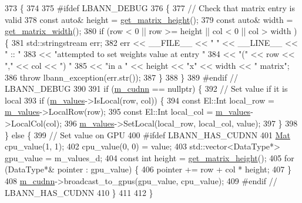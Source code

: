 \begin{DoxyCode}
373                                                         \{
374 
375 \textcolor{preprocessor}{#ifdef LBANN\_DEBUG}
376   \{
377     \textcolor{comment}{// Check that matrix entry is valid}
378     \textcolor{keyword}{const} \textcolor{keyword}{auto}& height = \hyperlink{classlbann_1_1weights_ad36676b9b43bced1cc7e332e3745411f}{get\_matrix\_height}();
379     \textcolor{keyword}{const} \textcolor{keyword}{auto}& width = \hyperlink{classlbann_1_1weights_abc3cf3a5b992302b1eaaea1fdf3b377d}{get\_matrix\_width}();
380     \textcolor{keywordflow}{if} (row < 0 || row >= height || col < 0 || col > width ) \{
381       std::stringstream err;
382       err << \_\_FILE\_\_ << \textcolor{stringliteral}{" "} << \_\_LINE\_\_ << \textcolor{stringliteral}{" :: "}
383           << \textcolor{stringliteral}{"attempted to set weights value at entry "}
384           << \textcolor{stringliteral}{"("} << row << \textcolor{stringliteral}{","} << col << \textcolor{stringliteral}{") "}
385           << \textcolor{stringliteral}{"in a "} << height << \textcolor{stringliteral}{"x"} << width << \textcolor{stringliteral}{" matrix"};
386       \textcolor{keywordflow}{throw} lbann\_exception(err.str());
387     \}
388   \}
389 \textcolor{preprocessor}{#endif // LBANN\_DEBUG}
390 
391   \textcolor{keywordflow}{if} (\hyperlink{classlbann_1_1weights_a873e8c14998915e442d03b8dd7d2fdf7}{m\_cudnn} == \textcolor{keyword}{nullptr}) \{
392     \textcolor{comment}{// Set value if it is local}
393     \textcolor{keywordflow}{if} (\hyperlink{classlbann_1_1weights_a6b2df671b6d4c4dd595477971eea0543}{m\_values}->IsLocal(row, col)) \{
394       \textcolor{keyword}{const} El::Int local\_row = \hyperlink{classlbann_1_1weights_a6b2df671b6d4c4dd595477971eea0543}{m\_values}->LocalRow(row);
395       \textcolor{keyword}{const} El::Int local\_col = \hyperlink{classlbann_1_1weights_a6b2df671b6d4c4dd595477971eea0543}{m\_values}->LocalCol(col);
396       \hyperlink{classlbann_1_1weights_a6b2df671b6d4c4dd595477971eea0543}{m\_values}->SetLocal(local\_row, local\_col, value);
397     \}
398   \} \textcolor{keywordflow}{else} \{
399     \textcolor{comment}{// Set value on GPU}
400 \textcolor{preprocessor}{    #ifdef LBANN\_HAS\_CUDNN}
401     \hyperlink{base_8hpp_a68f11fdc31b62516cb310831bbe54d73}{Mat} cpu\_value(1, 1);
402     cpu\_value(0, 0) = value;
403     std::vector<DataType*> gpu\_value = m\_values\_d;
404     \textcolor{keyword}{const} \textcolor{keywordtype}{int} height = \hyperlink{classlbann_1_1weights_ad36676b9b43bced1cc7e332e3745411f}{get\_matrix\_height}();
405     \textcolor{keywordflow}{for} (DataType*& pointer : gpu\_value) \{
406       pointer += row + col * height;
407     \}
408     \hyperlink{classlbann_1_1weights_a873e8c14998915e442d03b8dd7d2fdf7}{m\_cudnn}->broadcast\_to\_gpus(gpu\_value, cpu\_value);
409 \textcolor{preprocessor}{    #endif // LBANN\_HAS\_CUDNN}
410   \}
411 
412 \}
\end{DoxyCode}

